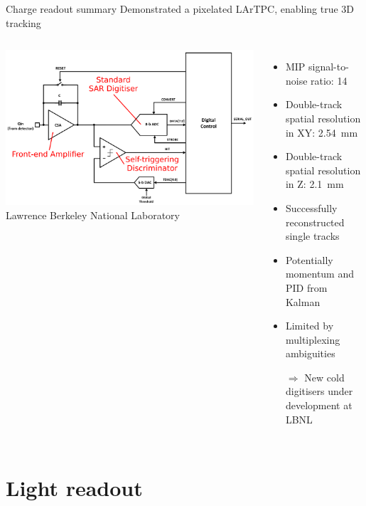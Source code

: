 \documentclass[]{beamer}
\newcommand*{\emphcol}{blue}
\newcommand*{\lartpc}{{LArTPC}}
\begin{document}
\begin{frame}{Charge readout summary}{\color{\emphcol} Demonstrated a pixelated \lartpc{}, enabling true 3D tracking}
	\begin{columns}[c]
		\centering
		\includegraphics[width=\textwidth]{larpix/schematic}\\
		{\tiny Lawrence Berkeley National Laboratory}
		\begin{itemize}
			\item MIP signal-to-noise ratio: \num{14}
			\item Double-track spatial resolution in XY: \SI{2.54}{\milli\metre}
			\item Double-track spatial resolution in Z: \SI{2.1}{\milli\metre}
			\item Successfully reconstructed single tracks
			\item Potentially momentum and PID from Kalman
			\item {\color{\emphcol} Limited by multiplexing ambiguities}
			\item[$\Rightarrow$] {\color{\emphcol} New cold digitisers under development at LBNL}
		\end{itemize}
	\end{columns}
\end{frame}

\section{Light readout}
\end{document}
